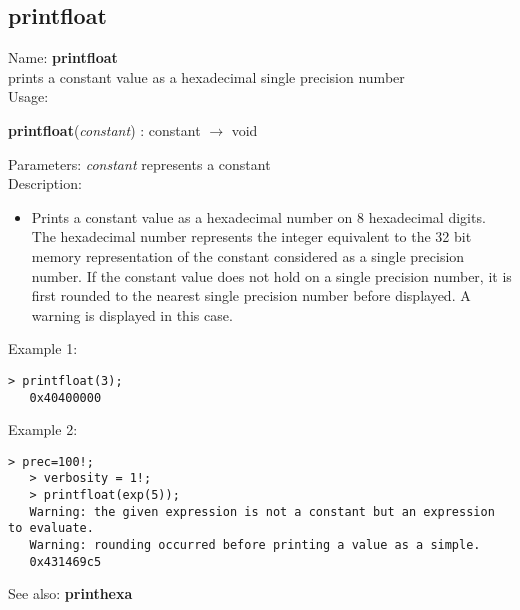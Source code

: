 \subsection{ printfloat }
\noindent Name: \textbf{printfloat}\\
prints a constant value as a hexadecimal single precision number\\

\noindent Usage: 
\begin{center}
\textbf{printfloat}(\emph{constant}) : \textsf{constant} $\rightarrow$ \textsf{void}\\
\end{center}
Parameters: 
\emph{constant} represents a constant\\

\noindent Description: \begin{itemize}

\item Prints a constant value as a hexadecimal number on 8 hexadecimal
   digits. The hexadecimal number represents the integer equivalent to
   the 32 bit memory representation of the constant considered as a
   single precision number.
   If the constant value does not hold on a single precision number, it
   is first rounded to the nearest single precision number before
   displayed. A warning is displayed in this case.
\end{itemize}
\noindent Example 1: 
\begin{center}\begin{minipage}{14.8cm}\begin{Verbatim}[frame=single]
   > printfloat(3);
   0x40400000
\end{Verbatim}
\end{minipage}\end{center}
\noindent Example 2: 
\begin{center}\begin{minipage}{14.8cm}\begin{Verbatim}[frame=single]
   > prec=100!;
   > verbosity = 1!;
   > printfloat(exp(5));
   Warning: the given expression is not a constant but an expression to evaluate.
   Warning: rounding occurred before printing a value as a simple.
   0x431469c5
\end{Verbatim}
\end{minipage}\end{center}
See also: \textbf{printhexa}
